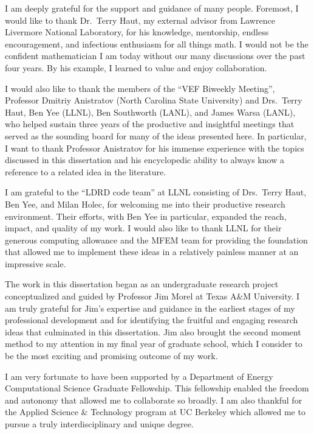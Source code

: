 \documentclass[../doc.tex]{subfiles}
\begin{document}
I am deeply grateful for the support and guidance of many people. 
Foremost, I would like to thank Dr.~Terry Haut, my external advisor from Lawrence Livermore National Laboratory, for his knowledge, mentorship, endless encouragement, and infectious enthusiasm for all things math. I would not be the confident mathematician I am today without our many discussions over the past four years. By his example, I learned to value and enjoy collaboration. 

I would also like to thank the members of the ``VEF Biweekly Meeting'', Professor Dmitriy Anistratov (North Carolina State University) and Drs.~Terry Haut, Ben Yee (LLNL), Ben Southworth (LANL), and James Warsa (LANL), who helped sustain three years of the productive and insightful meetings that served as the sounding board for many of the ideas presented here. In particular, I want to thank Professor Anistratov for his immense experience with the topics discussed in this dissertation and his encyclopedic ability to always know a reference to a related idea in the literature. 

I am grateful to the ``LDRD code team'' at LLNL consisting of Drs.~Terry Haut, Ben Yee, and Milan Holec, for welcoming me into their productive research environment. Their efforts, with Ben Yee in particular, expanded the reach, impact, and quality of my work. I would also like to thank LLNL for their generous computing allowance and the MFEM team for providing the foundation that allowed me to implement these ideas in a relatively painless manner at an impressive scale. 

The work in this dissertation began as an undergraduate research project conceptualized and guided by Professor Jim Morel at Texas A\&M University. I am truly grateful for Jim's expertise and guidance in the earliest stages of my professional development and for identifying the fruitful and engaging research ideas that culminated in this dissertation. 
Jim also brought the second moment method to my attention in my final year of graduate school, which I consider to be the most exciting and promising outcome of my work. 

I am very fortunate to have been supported by a Department of Energy Computational Science Graduate Fellowship. This fellowship enabled the freedom and autonomy that allowed me to collaborate so broadly. I am also thankful for the Applied Science \& Technology program at UC Berkeley which allowed me to pursue a truly interdisciplinary and unique degree. 
\end{document}
